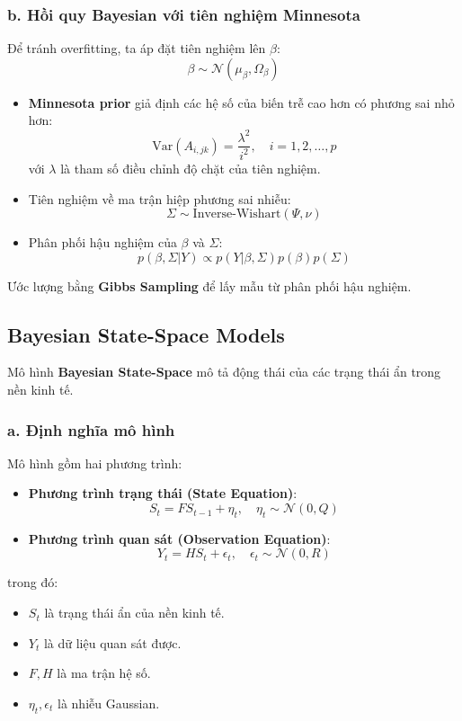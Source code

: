 \subsubsection{b. Hồi quy Bayesian với tiên nghiệm Minnesota}
Để tránh overfitting, ta áp đặt tiên nghiệm lên $\beta$:
\begin{equation}
    \beta \sim \mathcal{N}(\mu_\beta, \Omega_\beta)
\end{equation}
\begin{itemize}
    \item \textbf{Minnesota prior} giả định các hệ số của biến trễ cao hơn có phương sai nhỏ hơn:
    \begin{equation}
        \text{Var}(A_{i, jk}) = \frac{\lambda^2}{i^2}, \quad i = 1, 2, \dots, p
    \end{equation}
    với $\lambda$ là tham số điều chỉnh độ chặt của tiên nghiệm.
    \item Tiên nghiệm về ma trận hiệp phương sai nhiễu:
    \begin{equation}
        \Sigma \sim \text{Inverse-Wishart}(\Psi, \nu)
    \end{equation}
    \item Phân phối hậu nghiệm của $\beta$ và $\Sigma$:
    \begin{equation}
        p(\beta, \Sigma | Y) \propto p(Y | \beta, \Sigma) p(\beta) p(\Sigma)
    \end{equation}
\end{itemize}
Ước lượng bằng \textbf{Gibbs Sampling} để lấy mẫu từ phân phối hậu nghiệm.

\subsection{Bayesian State-Space Models}
Mô hình \textbf{Bayesian State-Space} mô tả động thái của các trạng thái ẩn trong nền kinh tế.

\subsubsection{a. Định nghĩa mô hình}
Mô hình gồm hai phương trình:
\begin{itemize}
    \item \textbf{Phương trình trạng thái (State Equation)}:
    \begin{equation}
        S_t = F S_{t-1} + \eta_t, \quad \eta_t \sim \mathcal{N}(0, Q)
    \end{equation}
    \item \textbf{Phương trình quan sát (Observation Equation)}:
    \begin{equation}
        Y_t = H S_t + \epsilon_t, \quad \epsilon_t \sim \mathcal{N}(0, R)
    \end{equation}
\end{itemize}
trong đó:
\begin{itemize}
    \item $S_t$ là trạng thái ẩn của nền kinh tế.
    \item $Y_t$ là dữ liệu quan sát được.
    \item $F, H$ là ma trận hệ số.
    \item $\eta_t, \epsilon_t$ là nhiễu Gaussian.
\end{itemize}

